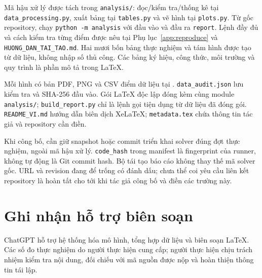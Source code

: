 Mã hậu xử lý được tách trong \texttt{analysis/}: đọc/kiểm tra/thống kê tại \texttt{data\_processing.py}, xuất bảng tại \texttt{tables.py} và vẽ hình tại \texttt{plots.py}. Từ gốc repository, chạy \texttt{python -m analysis} với đầu vào  và đầu ra \texttt{report}. Lệnh đầy đủ và cách kiểm tra từng điểm được nêu tại Phụ lục~\ref{app:reproduce} và \texttt{HUONG\_DAN\_TAI\_TAO.md}. Hai mươi bốn bảng thực nghiệm và tám hình được tạo từ dữ liệu, không nhập số thủ công. Các bảng ký hiệu, công thức, môi trường và quy trình là phần mô tả trong LaTeX.

Mỗi hình có bản PDF, PNG và CSV điểm dữ liệu tại . \texttt{data\_audit.json} lưu kiểm tra và SHA-256 đầu vào. Gói LaTeX độc lập đóng kèm cùng module \texttt{analysis/}; \texttt{build\_report.py} chỉ là lệnh gọi tiện dụng từ dữ liệu đã đóng gói. \texttt{README\_VI.md} hướng dẫn biên dịch XeLaTeX; \texttt{metadata.tex} chứa thông tin tác giả và repository cần điền.

Khi công bố, cần giữ snapshot hoặc commit triển khai solver đúng đợt thực nghiệm, ngoài mã hậu xử lý. \texttt{code\_hash} trong manifest là fingerprint của runner, không tự động là Git commit hash. Bộ tái tạo báo cáo không thay thế mã solver gốc. URL và revision đang để trống có đánh dấu; chưa thể coi yêu cầu liên kết repository là hoàn tất cho tới khi tác giả công bố và điền các trường này.

\section*{Ghi nhận hỗ trợ biên soạn}
ChatGPT hỗ trợ hệ thống hóa mô hình, tổng hợp dữ liệu và biên soạn LaTeX. Các số đo thực nghiệm do người thực hiện cung cấp; người thực hiện chịu trách nhiệm kiểm tra nội dung, đối chiếu với mã nguồn được nộp và hoàn thiện thông tin tái lập.

